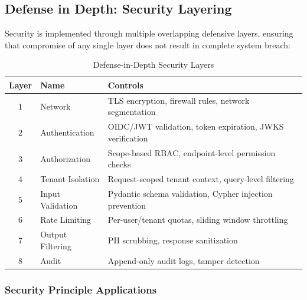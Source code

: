 \subsection{Defense in Depth: Security Layering}
\label{subsec:defense-in-depth}

Security is implemented through multiple overlapping defensive layers, ensuring that compromise of any single layer does not result in complete system breach:

\begin{table}[htbp]
\centering
\caption{Defense-in-Depth Security Layers}
\label{tab:security-layers}
\small
\begin{tabular}{|c|l|p{7cm}|}
\hline
\textbf{Layer} & \textbf{Name} & \textbf{Controls} \\
\hline
1 & Network & TLS encryption, firewall rules, network segmentation \\
\hline
2 & Authentication & OIDC/JWT validation, token expiration, JWKS verification \\
\hline
3 & Authorization & Scope-based RBAC, endpoint-level permission checks \\
\hline
4 & Tenant Isolation & Request-scoped tenant context, query-level filtering \\
\hline
5 & Input Validation & Pydantic schema validation, Cypher injection prevention \\
\hline
6 & Rate Limiting & Per-user/tenant quotas, sliding window throttling \\
\hline
7 & Output Filtering & PII scrubbing, response sanitization \\
\hline
8 & Audit & Append-only audit logs, tamper detection \\
\hline
\end{tabular}
\end{table}

\subsubsection{Security Principle Applications}

